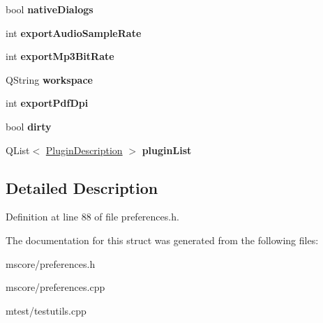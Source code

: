 \begin{DoxyCompactItemize}
\mbox{\label{struct_ms_1_1_preferences_a067c18cadc59d3913bd37543dd949cb3}} 
bool {\bfseries native\+Dialogs}
\item 
\mbox{\label{struct_ms_1_1_preferences_aa44ba147d787374676069062bd38abf6}} 
int {\bfseries export\+Audio\+Sample\+Rate}
\item 
\mbox{\label{struct_ms_1_1_preferences_a9f500444dbe06b459218bfa8665753a8}} 
int {\bfseries export\+Mp3\+Bit\+Rate}
\item 
\mbox{\label{struct_ms_1_1_preferences_a91ee8be616e321528c7b8ce802805312}} 
Q\+String {\bfseries workspace}
\item 
\mbox{\label{struct_ms_1_1_preferences_a7d7a555caf2f7ed5f6a98f2fe6eae0d9}} 
int {\bfseries export\+Pdf\+Dpi}
\item 
\mbox{\label{struct_ms_1_1_preferences_a9d7f18ed5d8349d24b1eb8a34917efe1}} 
bool {\bfseries dirty}
\item 
\mbox{\label{struct_ms_1_1_preferences_a162465f2a396ce0fd56d10c0cb0ad262}} 
Q\+List$<$ \hyperlink{struct_ms_1_1_plugin_description}{Plugin\+Description} $>$ {\bfseries plugin\+List}
\end{DoxyCompactItemize}


\subsection{Detailed Description}


Definition at line 88 of file preferences.\+h.



The documentation for this struct was generated from the following files\+:\begin{DoxyCompactItemize}
\item 
mscore/preferences.\+h\item 
mscore/preferences.\+cpp\item 
mtest/testutils.\+cpp\end{DoxyCompactItemize}
